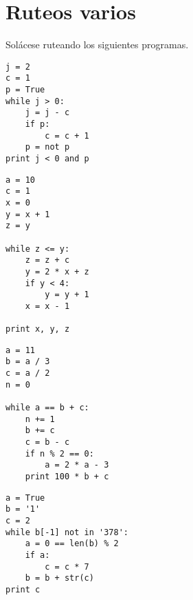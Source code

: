 \section{Ruteos varios}

Solácese ruteando los siguientes programas.

\begin{lstlisting}
j = 2
c = 1
p = True
while j > 0:
    j = j - c
    if p:
        c = c + 1
    p = not p
print j < 0 and p
\end{lstlisting}

\begin{lstlisting}
a = 10
c = 1
x = 0
y = x + 1
z = y

while z <= y:
    z = z + c
    y = 2 * x + z
    if y < 4:
        y = y + 1
    x = x - 1

print x, y, z
\end{lstlisting}

\begin{lstlisting}
a = 11
b = a / 3
c = a / 2
n = 0

while a == b + c:
    n += 1
    b += c
    c = b - c
    if n % 2 == 0:
        a = 2 * a - 3
    print 100 * b + c
\end{lstlisting}

\begin{lstlisting}
a = True
b = '1'
c = 2
while b[-1] not in '378':
    a = 0 == len(b) % 2
    if a:
        c = c * 7
    b = b + str(c)
print c
\end{lstlisting}

